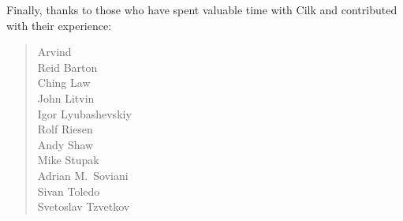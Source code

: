 \noindent Finally, thanks to those who have spent valuable time with Cilk and
contributed with their experience:
\begin{quote}
\noindent
Arvind\\
Reid Barton\\
Ching Law\\
John Litvin\\
Igor Lyubashevskiy\\
Rolf Riesen\\
Andy Shaw\\
Mike Stupak\\
Adrian M.\ Soviani\\
Sivan Toledo\\
Svetoslav Tzvetkov\\
\end{quote}
